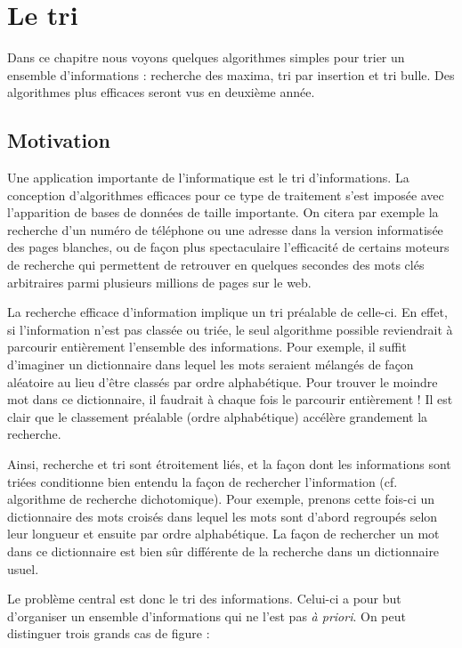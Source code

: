 \chapter{Le tri}

		Dans ce chapitre nous voyons quelques algorithmes simples pour trier un
		ensemble d'informations : recherche des maxima, tri
		par insertion et tri bulle. Des algorithmes plus efficaces seront vus
		en deuxième année.

	\section{Motivation}
		Une application importante de l’informatique est le tri d’informations.
		La conception d’algorithmes efficaces pour ce type de traitement s’est
		imposée avec l’apparition de bases de données de taille importante. On
		citera par exemple la recherche d’un numéro de téléphone ou une adresse
		dans la version informatisée des pages blanches, ou de façon plus
		spectaculaire l’efficacité de certains moteurs de recherche qui
		permettent de retrouver en quelques secondes des mots clés arbitraires
		parmi plusieurs millions de pages sur le web.


		La recherche efficace d’information implique un tri préalable de
		celle-ci. En effet, si l’information n’est pas classée ou triée, le
		seul algorithme possible reviendrait à parcourir entièrement l’ensemble
		des informations. Pour exemple, il suffit d’imaginer un dictionnaire
		dans lequel les mots seraient mélangés de façon aléatoire au lieu
		d’être classés par ordre alphabétique. Pour trouver le moindre mot dans
		ce dictionnaire, il faudrait à chaque fois le parcourir entièrement !
		Il est clair que le classement préalable (ordre alphabétique) accélère
		grandement la recherche.


		Ainsi, recherche et tri sont étroitement liés, et la façon dont les
		informations sont triées conditionne bien entendu la façon de
		rechercher l’information (cf. algorithme de recherche dichotomique).
		Pour exemple, prenons cette fois-ci un dictionnaire des mots croisés
		dans lequel les mots sont d’abord regroupés selon leur longueur et
		ensuite par ordre alphabétique. La façon de rechercher un mot dans ce
		dictionnaire est bien sûr différente de la recherche dans un
		dictionnaire usuel. 

		Le problème central est donc le tri des informations. Celui-ci a pour
		but d’organiser un ensemble d’informations qui ne l’est pas \textit{à
		priori}. On peut distinguer trois grands cas de figure :

